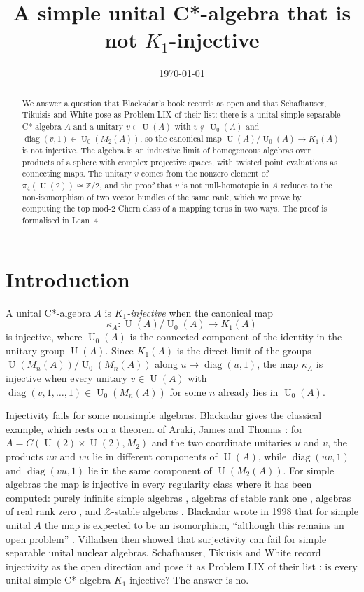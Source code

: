 \documentclass[11pt]{amsart}
\title{A simple unital C*-algebra that is not $K_1$-injective}
\author{\paperauthor}
\date{\today}
\theoremstyle{plain}
\theoremstyle{definition}
\newcommand{\U}{\operatorname{U}}
\newcommand{\Uz}{\operatorname{U}_0}
\begin{document}
\begin{abstract}
We answer a question that Blackadar's book records as open and that
Schafhauser, Tikuisis and White pose as Problem LIX of their list: there is a
unital simple separable C*-algebra $A$ and a unitary $v \in \U(A)$ with
$v \notin \Uz(A)$ and $\operatorname{diag}(v,1) \in \Uz(M_2(A))$, so the
canonical map $\U(A)/\Uz(A) \to K_1(A)$ is not injective.  The algebra is an
inductive limit of homogeneous algebras over products of a sphere with complex
projective spaces, with twisted point evaluations as connecting maps.  The
unitary $v$ comes from the nonzero element of $\pi_4(\U(2)) \cong \mathbb Z/2$,
and the proof that $v$ is not null-homotopic in $A$ reduces to the
non-isomorphism of two vector bundles of the same rank, which we prove by
computing the top mod-2 Chern class of a mapping torus in two ways.  The proof
is formalised in Lean~4.
\end{abstract}

\maketitle

\section{Introduction}
\label{sec:intro}

A unital C*-algebra $A$ is \emph{$K_1$-injective} when the canonical map
\[
  \kappa_A \colon \U(A)/\Uz(A) \longrightarrow K_1(A)
\]
is injective, where $\Uz(A)$ is the connected component of the identity in the
unitary group $\U(A)$.  Since $K_1(A)$ is the direct limit of the groups
$\U(M_n(A))/\Uz(M_n(A))$ along $u \mapsto \operatorname{diag}(u,1)$, the map
$\kappa_A$ is injective when every unitary $v \in \U(A)$ with
$\operatorname{diag}(v,1,\dots,1) \in \Uz(M_n(A))$ for some $n$ already lies in
$\Uz(A)$.

Injectivity fails for some nonsimple algebras.  Blackadar
\cite[8.1.2(d)]{Bl} gives the classical example, which rests on a theorem of
Araki, James and Thomas \cite{AJT}: for $A = C(\U(2) \times \U(2), M_2)$ and
the two coordinate unitaries $u$ and $v$, the products $uv$ and $vu$ lie in
different components of $\U(A)$, while $\operatorname{diag}(uv,1)$ and
$\operatorname{diag}(vu,1)$ lie in the same component of $\U(M_2(A))$.  For
simple algebras the map is injective in every regularity class where it has
been computed: purely infinite simple algebras \cite{Cu}, algebras of stable
rank one \cite{Ri}, algebras of real rank zero \cite{Li}, and
$\mathcal Z$-stable algebras \cite{Ji}.  Blackadar wrote in 1998 that for
simple unital $A$ the map is expected to be an isomorphism, ``although this
remains an open problem'' \cite[\S 8.1]{Bl}.  Villadsen \cite{Vi02} then showed
that surjectivity can fail for simple separable unital nuclear algebras.
Schafhauser, Tikuisis and White record injectivity as the open direction and
pose it as Problem LIX of their list \cite{STW}: is every unital simple
C*-algebra $K_1$-injective?  The answer is no.
\end{document}
